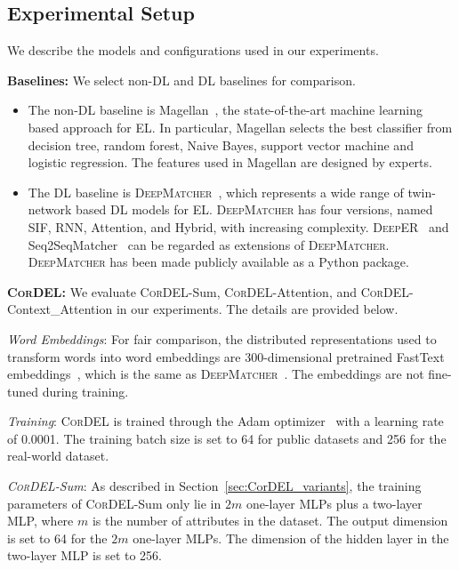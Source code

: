 \documentclass[conference]{IEEEtran}
\begin{document}
\subsection{Experimental Setup}

We describe the models and configurations used in our experiments.

\textbf{Baselines:} We select non-DL and DL baselines for comparison.
\begin{itemize}
    \item The non-DL baseline is Magellan~\cite{konda2016magellan}, the state-of-the-art machine learning based approach for EL. In particular, Magellan selects the best classifier from decision tree, random forest, Naive Bayes, support vector machine and logistic regression. The features used in Magellan are designed by experts.
    
    \item The DL baseline is \textsc{DeepMatcher}~\cite{mudgal2018deep}, which represents a wide range of twin-network based DL models for EL. \textsc{DeepMatcher} has four versions, named SIF, RNN, Attention, and Hybrid, with increasing complexity. \textsc{DeepER}~\cite{ebraheem2018distributed} and Seq2SeqMatcher~\cite{nie2019deep} can be regarded as extensions of \textsc{DeepMatcher}. \textsc{DeepMatcher} has been made publicly available as a Python package.
\end{itemize}

\textbf{\textsc{CorDEL}:} We evaluate \textsc{CorDEL}-Sum, \textsc{CorDEL}-Attention, and \textsc{CorDEL}-Context\_Attention in our experiments. The details are provided below.

\textit{Word Embeddings}: For fair comparison, the distributed representations used to transform words into word embeddings are 300-dimensional pretrained FastText embeddings~\cite{joulin2017bag}, which is the same as \textsc{DeepMatcher}~\cite{mudgal2018deep}. The embeddings are not fine-tuned during training.

\textit{Training}: \textsc{CorDEL} is trained through the Adam optimizer~\cite{kingma2014adam} with a learning rate of 0.0001. The training batch size is set to 64 for public datasets and 256 for the real-world dataset.

\textit{\textsc{CorDEL}-Sum}: As described in Section~\ref{sec:CorDEL_variants}, the training parameters of \textsc{CorDEL}-Sum only lie in $2m$ one-layer MLPs plus a two-layer MLP, where $m$ is the number of attributes in the dataset. The output dimension is set to 64 for the $2m$ one-layer MLPs. The dimension of the hidden layer in the two-layer MLP is set to 256.
\end{document}
